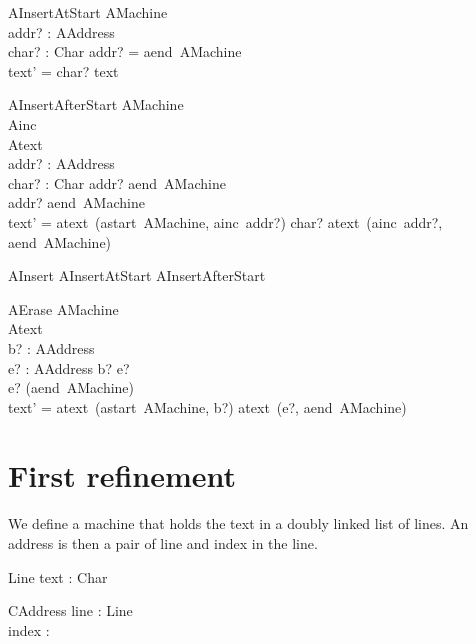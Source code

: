 \documentclass{article}
\begin{document}
\begin{schema}{AInsertAtStart}
  \Delta AMachine \\
  addr? : AAddress \\
  char? : Char
\where
  addr? = aend~\theta AMachine \\
  text' = \langle char? \rangle \cat text
\end{schema}

\begin{schema}{AInsertAfterStart}
  \Delta AMachine \\
  Ainc \\
  Atext \\
  addr? : AAddress \\
  char? : Char
\where
  addr?  aend~\theta AMachine \\
  addr?  \neq aend~\theta AMachine \\
  text' = atext~(astart~\theta AMachine, ainc~addr?) \cat \langle char? \rangle \cat atext~(ainc~addr?, aend~\theta AMachine)
\end{schema}

\begin{zed}
  AInsert  AInsertAtStart \lor AInsertAfterStart
\end{zed}


\begin{schema}{AErase}
  \Delta AMachine \\
  Atext \\
  b? : AAddress\\
  e? : AAddress 
\where
  b?  e? \\
  e?  (aend~\theta AMachine) \\
  text' = atext~(astart~\theta AMachine, b?) \cat atext~(e?, aend~\theta AMachine) 
\end{schema}

\section{First refinement}

We define a machine that holds the text in a doubly linked list of
lines. An address is then a pair of line and index in the line.

\begin{schema}{Line}
  text : \seq Char \\
\end{schema}

\begin{schema}{CAddress}
  line : Line \\
  index : \nat
\end{schema}
\end{document}
